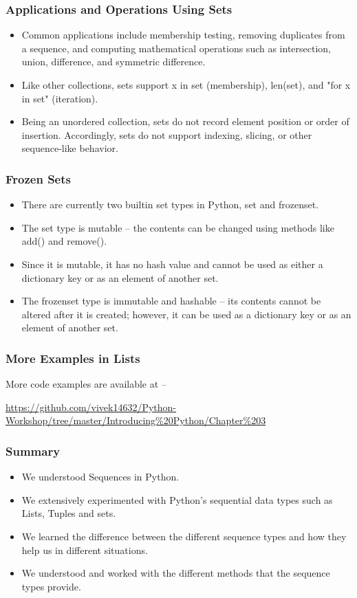 \documentclass{beamer}
\begin{document}
\begin{frame}
\frametitle{Applications and Operations Using Sets}
\begin{itemize}
\item Common applications include membership testing, removing duplicates from a sequence, and computing mathematical operations such as intersection, union, difference, and symmetric difference.
\item Like other collections, sets support x in set (membership), len(set), and "for x in set" (iteration). 
\item Being an unordered collection, sets do not record element position or order of insertion. Accordingly, sets do not support indexing, slicing, or other sequence-like behavior.
\end{itemize}
\end{frame}

\begin{frame}
\frametitle{Frozen Sets}
\begin{itemize}
\item There are currently two builtin set types in Python, set and frozenset. 
\item The set type is mutable -- the contents can be changed using methods like add() and remove(). 
\item Since it is mutable, it has no hash value and cannot be used as either a dictionary key or as an element of another set. 
\item The frozenset type is immutable and hashable -- its contents cannot be altered after it is created; however, it can be used as a dictionary key or as an element of another set.
\end{itemize}
\end{frame}

\begin{frame}
\frametitle{More Examples in Lists}
More code examples are available at --
 
\url{https://github.com/vivek14632/Python-Workshop/tree/master/Introducing\%20Python/Chapter\%203}
\end{frame}


\begin{frame}
\frametitle{Summary}
\begin{itemize}
\item We understood Sequences in Python.
\item We extensively experimented with Python's sequential data types such as Lists, Tuples and sets.
\item We learned the difference between the different sequence types and how they help us in different situations.
\item We understood and worked with the different methods that the sequence types provide.
\end{itemize}
\end{frame}
\end{document}
